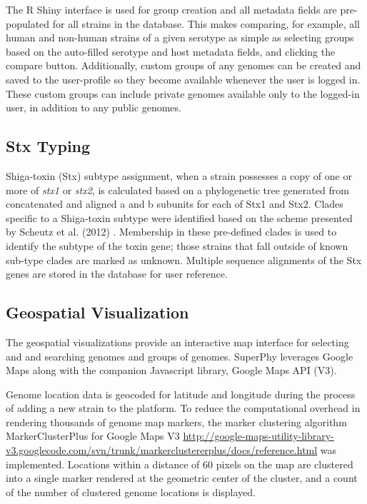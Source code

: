 \documentclass[doublespacing, linenumbers]{bmcart}
\begin{document}
The R Shiny interface is used for group creation and all metadata fields are pre-populated for all strains in the database. This makes comparing, for example, all human and non-human strains of a given serotype as simple as selecting groups based on the auto-filled serotype and host metadata fields, and clicking the compare button. Additionally, custom groups of any genomes can be created and saved to the user-profile so they become available whenever the user is logged in. These custom groups can include private genomes available only to the logged-in user, in addition to any public genomes.

\subsection{Stx Typing}
Shiga-toxin (Stx) subtype assignment, when a strain possesses a copy of one or more of \textit{stx1} or \textit{stx2}, is calculated based on a phylogenetic tree generated from concatenated and aligned a and b subunits for each of Stx1 and Stx2. Clades specific to a Shiga-toxin subtype were identified based on the scheme presented by Scheutz et al. (2012) \cite{scheutz_multicenter_2012}. Membership in these pre-defined clades is used to identify the subtype of the toxin gene; those strains that fall outside of known sub-type clades are marked as unknown. Multiple sequence alignments of the Stx genes are stored in the database for user reference.

\subsection{Geospatial Visualization}
The geospatial visualizations provide an interactive map interface for selecting and and searching genomes and groups of genomes. SuperPhy leverages Google Maps along with the companion Javascript library, Google Maps API (V3).

Genome location data is geocoded for latitude and longitude during the process of adding a new strain to the platform. To reduce the computational overhead in  rendering thousands of genome map markers, the marker clustering algorithm MarkerClusterPlus for Google Maps V3 \url{http://google-maps-utility-library-v3.googlecode.com/svn/trunk/markerclustererplus/docs/reference.html} was implemented. Locations within a distance of 60 pixels on the map are clustered into a single marker rendered at the geometric center of the cluster, and a count of the number of clustered genome locations is displayed. 
\end{document}
